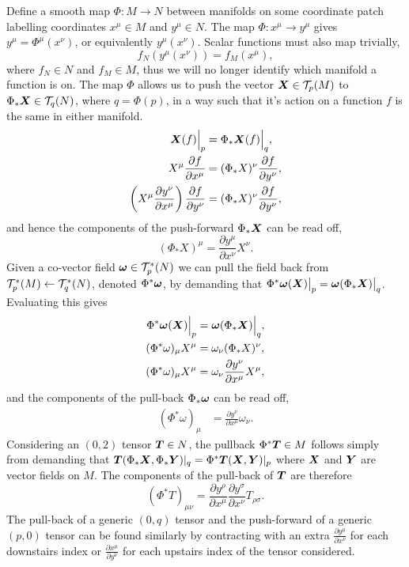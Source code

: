 Define a smooth map $\Phi : M \rightarrow N$ between manifolds on some coordinate patch labelling coordinates $x^\mu\in M$ and $y^\mu\in N$. The map $\Phi:x^\mu \rightarrow y^\mu$ gives $y^\mu = \Phi^\mu(x^\nu)$, or equivalently $y^\mu(x^\nu)$. Scalar functions must also map trivially,
\begin{equation}
f_N(y^\mu(x^\nu))=f_M(x^\mu),
\end{equation} 
 where $f_N\in N$ and $f_M \in M$, thus we will no longer identify which manifold a function is on. The map $\Phi$ allows us to push the vector $\boldsymbol{X}\in\mathcal{T}_p(M)$ to $\Phi_* \boldsymbol{X} \in \mathcal{T}_q(N)$, where $q=\Phi(p)$, in a way such that it's action on a function $f$ is the same in either manifold. 
\begin{align}
\boldsymbol{X}(f)\Big|_p &= \Phi_*\boldsymbol{X}(f)\Big|_q ,\\
X^\mu \frac{\partial f}{\partial x^\mu}  &= (\Phi_* X)^\nu\frac{\partial f}{\partial y^\nu} , \\
\left( X^\mu \frac{\partial y^\nu}{\partial x^\mu}\right) \frac{\partial f}{\partial y^\nu}  &= (\Phi_* X)^\nu\frac{\partial f}{\partial y^\nu},
\end{align} 
and hence the components of the push-forward $\Phi_* \boldsymbol{X}$ can be read off,
\begin{equation}
(\Phi_* X)^\mu = \frac{\partial y^\mu}{\partial x^\nu}X^\nu.
\end{equation}
Given a co-vector field $\boldsymbol{\omega} \in \mathcal{T}^*_p(N)$ we can pull the field back from $\mathcal{T}^*_p(M) \leftarrow \mathcal{T}^*_q(N)$, denoted $\Phi^*\boldsymbol{\omega}$, by demanding that $\Phi^*\boldsymbol{\omega}(\boldsymbol{X})\big|_p = \boldsymbol{\omega}(\Phi_* \boldsymbol{X})\big|_q$. Evaluating this gives 
\begin{align}
\Phi^*\boldsymbol{\omega}(\boldsymbol{X})\Big|_p &= \boldsymbol{\omega}(\Phi_* \boldsymbol{X})\Big|_q, \\
(\Phi^* \omega)_\mu X^\mu&= \omega_\nu (\Phi_*X)^\nu , \\ 
(\Phi^* \omega)_\mu X^\mu&= \omega_\nu \frac{\partial y^\nu}{\partial x^\mu} X^\mu ,
\end{align}
and the components of the pull-back $\Phi_*\boldsymbol{\omega}$ can be read off,
\begin{align}
(\Phi^* \omega)_\mu &=  \frac{\partial y^\nu}{\partial x^\mu}\omega_\nu.
\end{align}
Considering an $(0,2)$ tensor $\boldsymbol{T} \in N$, the pullback $\Phi^*\boldsymbol{T} \in M$ follows simply from demanding that $\boldsymbol{T}(\Phi_* \boldsymbol{X},\Phi_*\boldsymbol{Y})|_q = \Phi^*\boldsymbol{T}(\boldsymbol{X},\boldsymbol{Y})|_p$ where $\boldsymbol{X}$ and $\boldsymbol{Y}$ are vector fields on $M$. The components of the pull-back of $\boldsymbol{T}$ are therefore
\begin{equation}
(\Phi^*T)_{\mu\nu} = \frac{\partial y^\rho}{\partial x^\mu} \frac{\partial y^\sigma}{\partial x^\nu}T_{\rho\sigma}.
\end{equation}
The pull-back of a generic $(0,q)$ tensor and the push-forward of a generic $(p,0)$ tensor can be found similarly by contracting with an extra $\frac{\partial y^\mu}{\partial x^\nu}$ for each downstairs index or $\frac{\partial x^\mu}{\partial y^\nu}$ for each upstairs index of the tensor considered.


